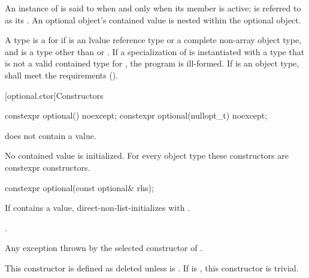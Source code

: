 \pnum
An instance of  is said to  when and only when its member  is active;  is referred to as its . An optional object's contained value is nested within the optional object.

\pnum
A type  is a  for  if  is an lvalue reference type or a complete non-array object type, and  is a type other than  or . If a specialization of  is instantiated with a type  that is not a valid contained type for , the program is ill-formed. If  is an object type,  shall meet the  requirements ().

[optional.ctor]{Constructors}

%
\begin{itemdecl}
constexpr optional() noexcept;
constexpr optional(nullopt_t) noexcept;
\end{itemdecl}

\begin{itemdescr}
\pnum
\ensures
{} does not contain a value.

\pnum
\remarks
No contained value is initialized. For every object type  these constructors are constexpr constructors.
\end{itemdescr}

%
\begin{itemdecl}
constexpr optional(const optional& rhs);
\end{itemdecl}

\begin{itemdescr}
\pnum
\effects
If  contains a value, direct-non-list-initializes  with .

\pnum
\ensures
{}.

\pnum
\throws
Any exception thrown by the selected constructor of .

\pnum
\remarks
This constructor is defined as deleted unless  is . If  is , this constructor is trivial.
\end{itemdescr}

